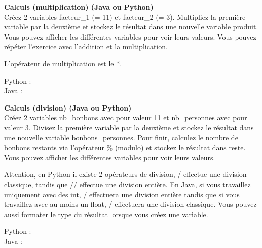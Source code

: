 \begin{Exercice}[20 minutes] \textbf{Calculs (multiplication) (Java ou Python)}\\

   Créez 2 variables facteur\_1 (= 11) et facteur\_2 (= 3). Multipliez la première variable par la deuxième et stockez le résultat dans une nouvelle variable produit. Vous pouvez afficher les différentes variables pour voir leurs valeurs. Vous pouvez répéter l'exercice avec l'addition et la multiplication. \\
   
    \begin{conseil}
      	L'opérateur de multiplication est le *.
        
    \end{conseil}
    \begin{solution}
    
    Python : \\
    
    
    
    Java : \\
    
    
           
    \end{solution}   
\end{Exercice}

\begin{Exercice}[20 minutes] \textbf{Calculs (division) (Java ou Python)}\\
   Créez 2 variables nb\_bonbons avec pour valeur 11 et nb\_personnes avec pour valeur 3. Divisez la première variable par la deuxième et stockez le résultat dans une nouvelle variable bonbons\_personnes. Pour finir, calculez le nombre de bonbons restants via l'opérateur \% (modulo) et stockez le résultat dans reste. Vous pouvez afficher les différentes variables pour voir leurs valeurs. \\
   
    \begin{conseil}
      	Attention, en Python il existe 2 opérateurs de division, / effectue une division classique, tandis que // effectue une division entière. En Java, si vous travaillez uniquement avec des int, / effectuera une division entière tandis que si vous travaillez avec au moins un float, / effectuera une division classique. Vous pouvez aussi formater le type du résultat lorsque vous créez une variable.
        
    \end{conseil}
    \begin{solution}
    
    Python : \\
    
    
    
    Java : \\
    
    
           
    \end{solution}   
\end{Exercice}

